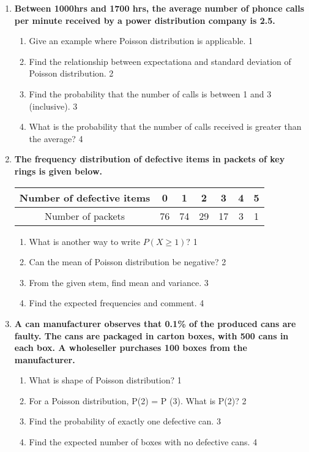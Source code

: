 \documentclass[a4paper,oneside, margin=1.4in]{book}
\begin{document}
\begin{enumerate}

   \item
	  \textbf{Between 1000hrs and 1700 hrs, the average number of phonce calls per minute received by a power distribution company is 2.5. } 
  
  \begin{enumerate}
    \item
	Give an example where Poisson distribution is applicable. \hfill 1
    \item
	Find the relationship between expectationa and standard deviation of Poisson distribution. \hfill 2
    \item  
	Find the probability that the number of calls is between 1 and 3 (inclusive). \hfill 3
    \item
	What is the probability that the number of calls received is greater than the average? \hfill 4
  \end{enumerate}
  
     \item
	  \textbf{The frequency distribution of defective items in packets of key rings is given below.} 
	  
	  \begin{table}[h]
	  \centering
\begin{tabular}{c|c|c|c|c|c|c}
Number of defective items & 0 & 1 & 2 & 3 & 4 & 5 \\ \hline
Number of packets & 76 & 74 & 29 & 17 & 3 & 1
\end{tabular}
\end{table}
  
  \begin{enumerate}
    \item
	What is another way to write $P(X \ge 1)$? \hfill 1
    \item
	Can the mean of Poisson distribution be negative? \hfill 2
    \item  
	From the given stem, find mean and variance. \hfill 3
    \item
	Find the expected frequencies and comment. \hfill 4
  \end{enumerate}
  
 \item
	  \textbf{A can manufacturer observes that 0.1\% of the produced cans are faulty. The cans are packaged in carton boxes, with 500 cans in each box. A wholeseller purchases 100 boxes from the manufacturer.} 
  
  \begin{enumerate}
    \item
	What is shape of Poisson distribution? \hfill 1
    \item
	For a Poisson distribution, P(2) = P (3). What is P(2)? \hfill 2
    \item  
	Find the probability of exactly one defective can. \hfill 3
    \item
	Find the expected number of boxes with no defective cans. \hfill 4
  \end{enumerate}
  

\end{enumerate}
\end{document}
